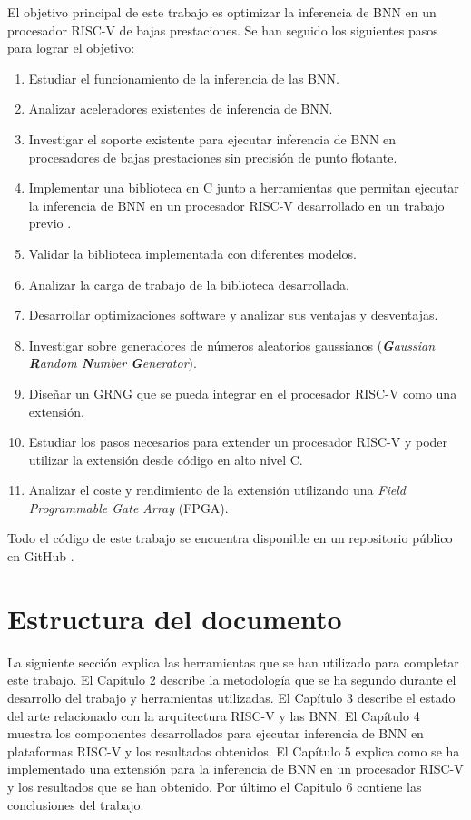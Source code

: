 El objetivo principal de este trabajo es optimizar la inferencia de BNN en un procesador RISC-V de bajas prestaciones. Se han seguido los siguientes pasos para lograr el objetivo:
\begin{enumerate}
    \item Estudiar el funcionamiento de la inferencia de las BNN.
    \item Analizar aceleradores existentes de inferencia de BNN.
    \item Investigar el soporte existente para ejecutar inferencia de BNN en procesadores de bajas prestaciones sin precisión de punto flotante.
    \item Implementar una biblioteca en C junto a herramientas que permitan ejecutar la inferencia de BNN en un procesador RISC-V desarrollado en un trabajo previo \cite{riscv_tfg}.
    \item Validar la biblioteca implementada con diferentes modelos.
    \item Analizar la carga de trabajo de la biblioteca desarrollada.
    \item Desarrollar optimizaciones software y analizar sus ventajas y desventajas.
    \item Investigar sobre generadores de números aleatorios gaussianos (\textit{\textbf{G}aussian \textbf{R}andom \textbf{N}umber \textbf{G}enerator}).
    \item Diseñar un GRNG que se pueda integrar en el procesador RISC-V como una extensión.
    \item Estudiar los pasos necesarios para extender un procesador RISC-V y poder utilizar la extensión desde código en alto nivel C.
    \item Analizar el coste y rendimiento de la extensión utilizando una \textit{Field Programmable Gate Array} (FPGA).
\end{enumerate}

Todo el código de este trabajo se encuentra disponible en un repositorio público en GitHub \cite{bnn_github}.


\section{Estructura del documento}

La siguiente sección explica las herramientas que se han utilizado para completar este trabajo. El Capítulo 2 describe la metodología que se ha segundo durante el desarrollo del trabajo y herramientas utilizadas. El Capítulo 3 describe el estado del arte relacionado con la arquitectura RISC-V y las BNN. El Capítulo 4 muestra los componentes desarrollados para ejecutar inferencia de BNN en plataformas RISC-V y los resultados obtenidos. El Capítulo 5 explica como se ha implementado una extensión para la inferencia de BNN en un procesador RISC-V y los resultados que se han obtenido. Por último el Capitulo 6 contiene las conclusiones del trabajo.

